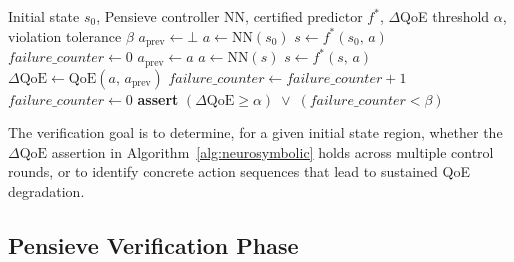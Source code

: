 \documentclass[thesis]{uofithesis} %
\begin{document}
    \begin{algorithm}[t]
        \caption{Neurosymbolic formulation of ABR streaming}
        \label{alg:neurosymbolic}
        \begin{algorithmic}[1]
            \Require Initial state $s_0$, Pensieve controller $\mathrm{NN}$,
                    certified predictor $f^{\ast}$, $\Delta$QoE threshold $\alpha$,
                    violation tolerance $\beta$
            \State $a_{\text{prev}} \gets \bot$
            \State $a \gets \mathrm{NN}(s_0)$
            \State $s \gets f^{\ast}(s_0,\, a)$
            \State $\mathit{failure\_counter} \gets 0$
                \State $a_{\text{prev}} \gets a$
                \State $a \gets \mathrm{NN}(s)$
                \State $s \gets f^{\ast}(s,\, a)$
                \State $\Delta\text{QoE} \gets \text{QoE}(a,\, a_{\text{prev}})$
                    \State $\mathit{failure\_counter} \gets
                        \mathit{failure\_counter} + 1$
                \Else
                    \State $\mathit{failure\_counter} \gets 0$
                \EndIf
                \State \textbf{assert}
                    $(\Delta\text{QoE} \geq \alpha) \;\lor\;
                        (\mathit{failure\_counter} < \beta)$
            \EndWhile
        \end{algorithmic}
    \end{algorithm}

    The verification goal is to determine, for a given initial state
    region, whether the $\Delta\text{QoE}$ assertion in
    Algorithm~\ref{alg:neurosymbolic} holds across multiple control
    rounds, or to identify concrete action sequences that lead to
    sustained QoE degradation.


    \subsection{Pensieve Verification Phase}
    \label{sec:verify-pensieve-phase}
\end{document}
